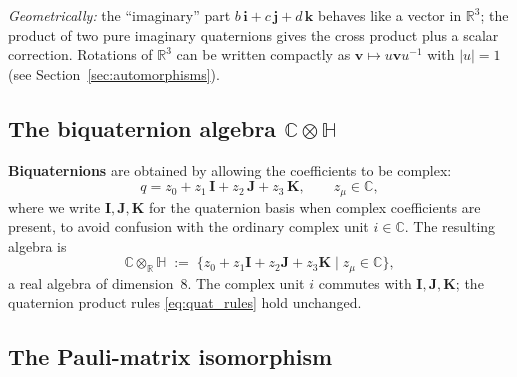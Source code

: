 \documentclass[12pt,a4paper]{article}
\theoremstyle{definition}
\theoremstyle{remark}
\begin{document}
\medskip
\noindent\textit{Geometrically:} the ``imaginary'' part
$b\,\mathbf{i}+c\,\mathbf{j}+d\,\mathbf{k}$ behaves like a vector in
$\mathbb{R}^3$; the product of two pure imaginary quaternions gives the
cross product plus a scalar correction.  Rotations of $\mathbb{R}^3$ can be
written compactly as $\mathbf{v} \mapsto u\mathbf{v}u^{-1}$ with $|u|=1$
(see Section~\ref{sec:automorphisms}).

\subsection{The biquaternion algebra $\mathbb{C}\otimes\mathbb{H}$}

\textbf{Biquaternions} are obtained by allowing the coefficients to be complex:
\begin{equation}
  \label{eq:biquat}
  q = z_0 + z_1\,\mathbf{I} + z_2\,\mathbf{J} + z_3\,\mathbf{K},
  \qquad z_\mu \in \mathbb{C},
\end{equation}
where we write $\mathbf{I},\mathbf{J},\mathbf{K}$ for the quaternion basis when
complex coefficients are present, to avoid confusion with the ordinary complex
unit $i\in\mathbb{C}$.  The resulting algebra is
\begin{equation}
  \mathbb{C}\otimes_{\mathbb{R}}\mathbb{H}
  \;:=\;
  \bigl\{ z_0 + z_1\mathbf{I} + z_2\mathbf{J} + z_3\mathbf{K}
          \;\big|\; z_\mu\in\mathbb{C} \bigr\},
\end{equation}
a real algebra of dimension~8.  The complex unit $i$ commutes with
$\mathbf{I},\mathbf{J},\mathbf{K}$; the quaternion product rules
\eqref{eq:quat_rules} hold unchanged.

\subsection{The Pauli-matrix isomorphism}
\end{document}

